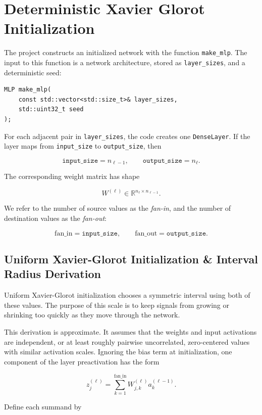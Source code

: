 \documentclass{article}
\begin{document}
\section{Deterministic Xavier Glorot Initialization}

The project constructs an initialized network with the function
\texttt{make\_mlp}. The input to this function is a network
architecture, stored as \texttt{layer\_sizes}, and a deterministic seed:

\begin{verbatim}
MLP make_mlp(
    const std::vector<std::size_t>& layer_sizes,
    std::uint32_t seed
);
\end{verbatim}

For each adjacent pair in \texttt{layer\_sizes}, the code creates one
\texttt{DenseLayer}. If the layer maps from \texttt{input\_size} to
\texttt{output\_size}, then

\[
  \texttt{input\_size} = n_{\ell-1},
  \qquad
  \texttt{output\_size} = n_\ell.
\]

The corresponding weight matrix has shape

\[
  W^{(\ell)}
  \in
  \mathbb{R}^{n_\ell \times n_{\ell-1}}.
\]

We refer to the number of source values as the \emph{fan-in}, and the
number of destination values as the \emph{fan-out}:

\[
  \text{fan\_in} = \texttt{input\_size},
  \qquad
  \text{fan\_out} = \texttt{output\_size}.
\]

\subsection{Uniform Xavier-Glorot Initialization \& Interval Radius Derivation}

Uniform Xavier-Glorot initialization chooses a symmetric interval
using both of these values. The purpose of this scale is to keep
signals from growing or shrinking too quickly as they move through the
network.

This derivation is approximate. It assumes that the weights and input
activations are independent, or at least roughly pairwise uncorrelated,
zero-centered values with similar activation scales. Ignoring the bias
term at initialization, one component of the layer preactivation has the
form

\[
  z_j^{(\ell)}
  =
  \sum_{k=1}^{\text{fan\_in}}
  W_{j,k}^{(\ell)} a_k^{(\ell-1)}.
\]

Define each summand by
\end{document}
